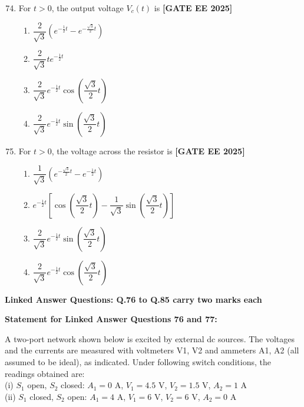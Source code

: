 \documentclass[12pt,a4paper]{article}
\begin{document}
\begin{enumerate}[leftmargin=*, label=\textbf{Q.\arabic*:}]
\setcounter{enumi}{73}

\item For $t>0$, the output voltage $V_c(t)$ is
\newline
\noindent \textbf{[GATE EE 2025]}
\begin{enumerate}[label=(\Alph*)]
  \item $\dfrac{2}{\sqrt{3}}\left(e^{-\frac{1}{2}t} - e^{-\frac{\sqrt{3}}{2}t}\right)$
  \item $\dfrac{2}{\sqrt{3}} t e^{-\frac{1}{2} t}$
  \item $\dfrac{2}{\sqrt{3}} e^{-\frac{1}{2} t} \cos\left( \dfrac{\sqrt{3}}{2} t \right)$
  \item $\dfrac{2}{\sqrt{3}} e^{-\frac{1}{2} t} \sin\left( \dfrac{\sqrt{3}}{2} t \right)$
\end{enumerate}

\item For $t>0$, the voltage across the resistor is
\newline
\noindent \textbf{[GATE EE 2025]}
\begin{enumerate}[label=(\Alph*)]
  \item $\dfrac{1}{\sqrt{3}} \left( e^{-\frac{\sqrt{3}}{2} t} - e^{-\frac{1}{2} t} \right)$
  \item $e^{-\frac{1}{2} t} \left[ \cos \left( \dfrac{\sqrt{3}}{2} t \right) - \dfrac{1}{\sqrt{3}} \sin \left( \dfrac{\sqrt{3}}{2} t \right) \right]$
  \item $\dfrac{2}{\sqrt{3}} e^{-\frac{1}{2} t} \sin \left( \dfrac{\sqrt{3}}{2} t \right)$
  \item $\dfrac{2}{\sqrt{3}} e^{-\frac{1}{2} t} \cos \left( \dfrac{\sqrt{3}}{2} t \right)$
\end{enumerate}

\end{enumerate}

\vspace{1em}
\item \textbf{Linked Answer Questions: Q.76 to Q.85 carry two marks each}
\item \textbf{Statement for Linked Answer Questions 76 and 77: }
\vspace{1em}
\newline
\item A two-port network shown below is excited by external dc sources. The voltages and the currents are measured with voltmeters V1, V2 and ammeters A1, A2 (all assumed to be ideal), as indicated. Under following switch conditions, the readings obtained are: \\
(i) $S_1$ open, $S_2$ closed: $A_1=0$ A, $V_1=4.5$ V, $V_2=1.5$ V, $A_2=1$ A \\
(ii) $S_1$ closed, $S_2$ open: $A_1=4$ A, $V_1=6$ V, $V_2=6$ V, $A_2=0$ A
\end{document}
